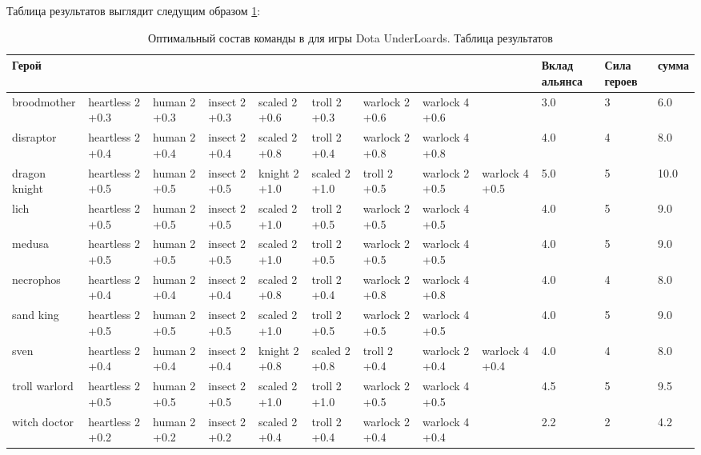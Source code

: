 \documentclass{article}
\begin{document}
Таблица результатов выглядит следущим образом \ref{solution}:
\begin{table}
\resizebox{17cm}{!} {
\begin{tabular}{l| *{8}{p{1.6cm}} | *{3}{ p{1cm}} }
\label{solution}
{Герой} &                   &               &                &                &                &                  &                  &                  &  Вклад альянса &  Сила героев &   сумма \\
\midrule
broodmother   &  heartless 2 +0.3  &  human 2 +0.3  &  insect 2 +0.3  &  scaled 2 +0.6  &   troll 2 +0.3  &  warlock  2 +0.6  &  warlock  4 +0.6  &                   &                  3.0 &           3 &   6.0 \\
disraptor     &  heartless 2 +0.4  &  human 2 +0.4  &  insect 2 +0.4  &  scaled 2 +0.8  &   troll 2 +0.4  &  warlock  2 +0.8  &  warlock  4 +0.8  &                   &                  4.0 &           4 &   8.0 \\
dragon knight &  heartless 2 +0.5  &  human 2 +0.5  &  insect 2 +0.5  &  knight 2 +1.0  &  scaled 2 +1.0  &     troll 2 +0.5  &  warlock  2 +0.5  &  warlock  4 +0.5  &                  5.0 &           5 &  10.0 \\
lich          &  heartless 2 +0.5  &  human 2 +0.5  &  insect 2 +0.5  &  scaled 2 +1.0  &   troll 2 +0.5  &  warlock  2 +0.5  &  warlock  4 +0.5  &                   &                  4.0 &           5 &   9.0 \\
medusa        &  heartless 2 +0.5  &  human 2 +0.5  &  insect 2 +0.5  &  scaled 2 +1.0  &   troll 2 +0.5  &  warlock  2 +0.5  &  warlock  4 +0.5  &                   &                  4.0 &           5 &   9.0 \\
necrophos     &  heartless 2 +0.4  &  human 2 +0.4  &  insect 2 +0.4  &  scaled 2 +0.8  &   troll 2 +0.4  &  warlock  2 +0.8  &  warlock  4 +0.8  &                   &                  4.0 &           4 &   8.0 \\
sand king     &  heartless 2 +0.5  &  human 2 +0.5  &  insect 2 +0.5  &  scaled 2 +1.0  &   troll 2 +0.5  &  warlock  2 +0.5  &  warlock  4 +0.5  &                   &                  4.0 &           5 &   9.0 \\
sven          &  heartless 2 +0.4  &  human 2 +0.4  &  insect 2 +0.4  &  knight 2 +0.8  &  scaled 2 +0.8  &     troll 2 +0.4  &  warlock  2 +0.4  &  warlock  4 +0.4  &                  4.0 &           4 &   8.0 \\
troll warlord &  heartless 2 +0.5  &  human 2 +0.5  &  insect 2 +0.5  &  scaled 2 +1.0  &   troll 2 +1.0  &  warlock  2 +0.5  &  warlock  4 +0.5  &                   &                  4.5 &           5 &   9.5 \\
witch doctor  &  heartless 2 +0.2  &  human 2 +0.2  &  insect 2 +0.2  &  scaled 2 +0.4  &   troll 2 +0.4  &  warlock  2 +0.4  &  warlock  4 +0.4  &                   &                  2.2 &           2 &   4.2 \\
\bottomrule
\end{tabular}
}
\caption{Оптимальный состав команды в для игры Dota UnderLoards. Таблица результатов }
\end{table}



\end{document}
